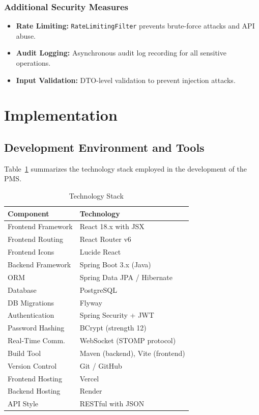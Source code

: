\documentclass[conference]{IEEEtran}
\begin{document}
\subsubsection{Additional Security Measures}
\begin{itemize}[leftmargin=*]
  \item \textbf{Rate Limiting:} \texttt{RateLimitingFilter} prevents brute-force attacks and API abuse.
  \item \textbf{Audit Logging:} Asynchronous audit log recording for all sensitive operations.
  \item \textbf{Input Validation:} DTO-level validation to prevent injection attacks.
\end{itemize}

\section{Implementation}

\subsection{Development Environment and Tools}
Table~\ref{tab:techstack} summarizes the technology stack employed in the development of the PMS.

\begin{table}[H]
\centering
\caption{Technology Stack}
\label{tab:techstack}
\begin{tabularx}{\columnwidth}{lX}
\toprule
\textbf{Component} & \textbf{Technology} \\
\midrule
Frontend Framework   & React 18.x with JSX \\
Frontend Routing     & React Router v6 \\
Frontend Icons       & Lucide React \\
Backend Framework    & Spring Boot 3.x (Java) \\
ORM                  & Spring Data JPA / Hibernate \\
Database             & PostgreSQL \\
DB Migrations        & Flyway \\
Authentication       & Spring Security + JWT \\
Password Hashing     & BCrypt (strength 12) \\
Real-Time Comm.      & WebSocket (STOMP protocol) \\
Build Tool           & Maven (backend), Vite (frontend) \\
Version Control      & Git / GitHub \\
Frontend Hosting     & Vercel \\
Backend Hosting      & Render \\
API Style            & RESTful with JSON \\
\bottomrule
\end{tabularx}
\end{table}
\end{document}
